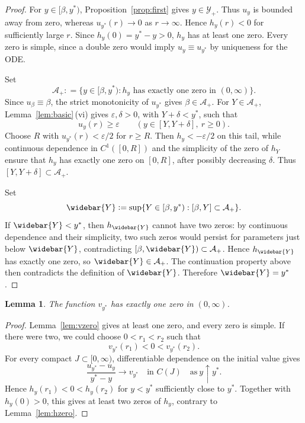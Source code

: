 \documentclass[12pt, a4paper, reqno]{amsart}
\numberwithin{equation}{section}
\newtheorem{lemma}[theorem]{Lemma}
\theoremstyle{definition}
\theoremstyle{remark}
\newcommand{\eps}{\varepsilon}
\newcommand{\ce}{\mathrel{\mathop:}=}
\begin{document}
\begin{proof}
For $y\in[\beta,y^*)$, Proposition~\ref{prop:first} gives
$y\in\mathcal Y_+$. Thus $u_y$ is bounded away from zero, whereas
$u_{y^*}(r)\to0$ as $r\to\infty$. Hence $h_y(r)<0$ for sufficiently
large $r$. Since $h_y(0)=y^*-y>0$, $h_y$ has at least one zero.
Every zero is simple, since a double zero would imply
$u_y\equiv u_{y^*}$ by uniqueness for the ODE.

Set
\[
  \mathcal A_+\ce
  \{y\in[\beta,y^*):
    h_y\text{ has exactly one zero in }(0,\infty)\}.
\]
Since $u_\beta\equiv\beta$, the strict monotonicity of $u_{y^*}$
gives $\beta\in\mathcal A_+$.
For $Y\in\mathcal A_+$, Lemma~\ref{lem:basic}\,\textup{(vi)} gives
$\eps,\delta>0$, with $Y+\delta<y^*$, such that
\[
  u_y(r)\ge\eps
  \qquad (y\in[Y,Y+\delta],\ r\ge0).
\]
Choose $R$ with $u_{y^*}(r)<\eps/2$ for $r\ge R$. Then
$h_y<-\eps/2$ on this tail, while continuous dependence in
$C^1([0,R])$ and the simplicity of the zero of $h_Y$ ensure that
$h_y$ has exactly one zero on $[0,R]$, after possibly decreasing
$\delta$. Thus $[Y,Y+\delta]\subset\mathcal A_+$.

Set
\[
  \widebar{Y}\ce
  \sup\{Y\in[\beta,y^*):[\beta,Y]\subset\mathcal A_+\}.
\]
If $\widebar{Y}<y^*$, then $h_{\widebar{Y}}$ cannot have two zeros:
by continuous dependence and their simplicity, two such zeros
would persist for parameters just below $\widebar{Y}$, contradicting
$[\beta,\widebar{Y})\subset\mathcal A_+$. Hence
$h_{\widebar{Y}}$ has exactly one zero, so
$\widebar{Y}\in\mathcal A_+$. The continuation property above
then contradicts the definition of $\widebar{Y}$.
Therefore $\widebar{Y}=y^*$.
\end{proof}

\begin{lemma}\label{lem:vstar}
The function $v_{y^*}$ has exactly one zero in $(0,\infty)$.
\end{lemma}

\begin{proof}
Lemma~\ref{lem:vzero} gives at least one zero, and every zero is simple. If
there were two, we could choose $0<r_1<r_2$ such that
\[
  v_{y^*}(r_1)<0<v_{y^*}(r_2).
\]
For every compact $J\subset[0,\infty)$, differentiable dependence on the
initial value gives
\[
  \frac{u_{y^*}-u_y}{y^*-y}
  \to v_{y^*}
  \quad\text{in }C(J)
  \quad\text{as}~y\uparrow y^*.
\]
Hence $h_y(r_1)<0<h_y(r_2)$ for $y<y^*$ sufficiently close to $y^*$.
Together with $h_y(0)>0$, this gives at least two zeros of $h_y$, contrary
to Lemma~\ref{lem:hzero}.
\end{proof}
\end{document}
